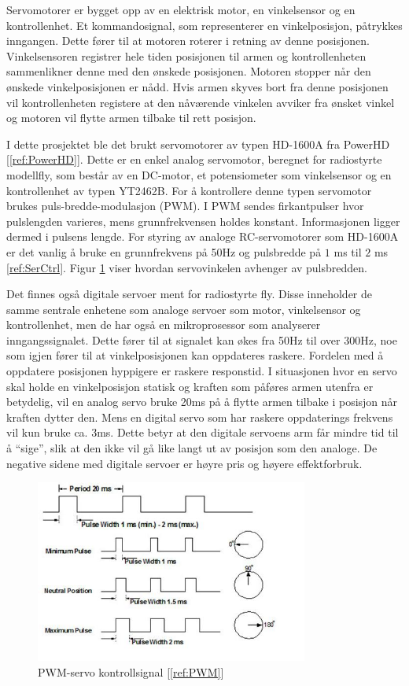 Servomotorer er bygget opp av en elektrisk motor, en vinkelsensor og en kontrollenhet. Et kommandosignal, som representerer en vinkelposisjon, påtrykkes inngangen. Dette fører til at motoren roterer i retning av denne posisjonen. Vinkelsensoren registrer hele tiden posisjonen til armen og kontrollenheten sammenlikner denne med den ønskede posisjonen. Motoren stopper når den ønskede vinkelposisjonen er nådd. Hvis armen skyves bort fra denne posisjonen vil kontrollenheten registere at den nåværende vinkelen avviker fra ønsket vinkel og motoren vil flytte armen tilbake til rett posisjon. 

I dette prosjektet ble det brukt servomotorer av typen HD-1600A fra PowerHD [\ref{ref:PowerHD}]. Dette er en enkel analog servomotor, beregnet for radiostyrte modellfly, som består av en DC-motor, et potensiometer som vinkelsensor og en kontrollenhet av typen YT2462B. For å kontrollere denne typen servomotor brukes puls-bredde-modulasjon (PWM). I PWM sendes firkantpulser hvor pulslengden varieres, mens grunnfrekvensen holdes konstant. Informasjonen ligger dermed i pulsens lengde. For styring av analoge RC-servomotorer som HD-1600A er det vanlig å bruke en grunnfrekvens på 50Hz og pulsbredde på $1$ ms til $2$ ms \ref{ref:SerCtrl}. Figur \ref{fig:PWM} viser hvordan servovinkelen avhenger av pulsbredden.

Det finnes også digitale servoer ment for radiostyrte fly. Disse inneholder de samme sentrale enhetene som analoge servoer som motor, vinkelsensor og kontrollenhet, men de har også en mikroprosessor som analyserer inngangssignalet. Dette fører til at signalet kan økes fra 50Hz til over 300Hz, noe som igjen fører til at vinkelposisjonen kan oppdateres raskere. Fordelen med å oppdatere posisjonen hyppigere er raskere responstid. I situasjonen hvor en servo skal holde en vinkelposisjon statisk og kraften som påføres armen utenfra er betydelig, vil en analog servo bruke 20ms på å flytte armen tilbake i posisjon når kraften dytter den. Mens en digital servo som har raskere oppdaterings frekvens vil kun bruke ca. 3ms. Dette betyr at den digitale servoens arm får mindre tid til å ``sige'', slik at den ikke vil gå like langt ut av posisjon som den analoge. De negative sidene med digitale servoer er høyre pris og høyere effektforbruk.    

\begin{figure}[H]
\centering
\includegraphics[width=0.8\textwidth]{img/pwm_servo.jpg}
\caption{PWM-servo kontrollsignal [\ref{ref:PWM}]}
\label{fig:PWM}
\end{figure}   

